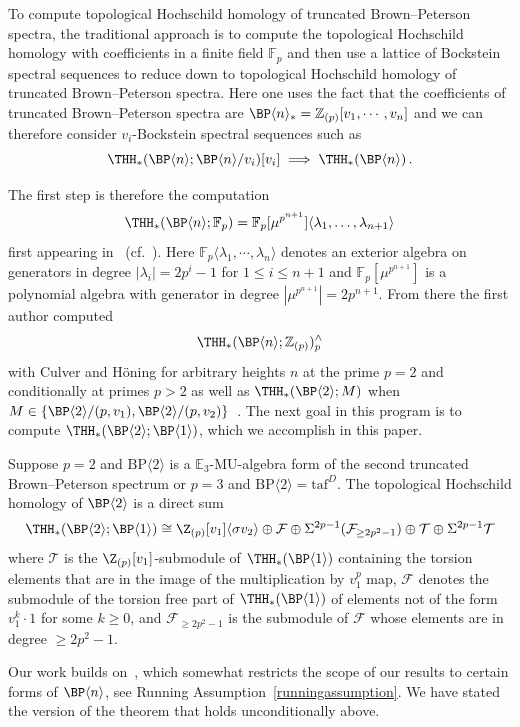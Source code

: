 To compute topological Hochschild homology of truncated Brown--Peterson spectra, the traditional approach is to compute the topological Hochschild homology with coefficients in a finite field $\mathbb{F}_p$ and then use a lattice of Bockstein spectral sequences to reduce down to topological Hochschild homology of truncated Brown--Peterson spectra. Here one uses the fact that the coefficients of truncated Brown--Peterson spectra are $\BP\langle n\rangle_*=\mathbb{Z}_{(p)}[v_1,\cdots ,v_n]$ and we can therefore consider $v_i$-Bockstein spectral sequences such as 
\[ 
\THH_*(\BP\langle n\rangle;\BP\langle n\rangle/v_i)[v_i]\implies \THH_*(\BP\langle n\rangle)\,.
\]

The first step is therefore the computation 
\[ \THH_*(\BP\langle n\rangle;\mathbb{F}_p)=\mathbb{F}_p[\mu^{p^{n+1}}]\langle \lambda_1,\dots ,\lambda_{n+1} \rangle
\]
first appearing in~\cite{ACH24} (cf.~\cite{Ang26}). Here  $\mathbb{F}_p\langle \lambda_1,\cdots ,\lambda_n\rangle$ denotes an exterior algebra on generators in degree $|\lambda_{i}|=2p^i-1$ for $1\le i\le n+1$ and $\mathbb{F}_p[\mu^{p^{n+1}}]$ is a polynomial algebra with generator in degree $|\mu^{p^{n+1}}|=2p^{n+1}$. From there the first author computed 
\[ \THH_*(\BP\langle n\rangle ; \mathbb{Z}_{(p)})_p^{\wedge}\]
with Culver and H\"oning for arbitrary heights $n$ at the prime $p=2$ and conditionally at primes $p>2$ as well as 
$\THH_*(\BP\langle 2\rangle ; M)$
when $M\in \{\BP\langle 2\rangle/(p,v_1),\BP\langle 2\rangle /(p,v_2)\}$~\cite{ACH24}. The next goal in this program is to compute $\THH_*(\BP\langle 2\rangle;\BP\langle 1\rangle)$,
which we accomplish in this paper. 

\begin{thmx}\label{thm:main}
  Suppose $p=2$ and $\mathrm{BP}\langle 2\rangle$ is a $\mathbb{E}_3$-$\mathrm{MU}$-algebra form of the second truncated Brown--Peterson spectrum or $p=3$ and $\mathrm{BP}\langle 2\rangle=\mathrm{taf}^{D}$. 
  The topological Hochschild homology of $\BP\langle 2\rangle$ is a direct sum
  \[
    \THH_*(\BP \langle 2 \rangle ; \BP \langle 1 \rangle) \cong \Z_{(p)}[v_1] \langle \sigma v_2 \rangle \oplus \mathcal{F} \oplus \Sigma^{2p - 1} (\mathcal{F}_{\geq 2p^2 - 1}) \oplus \mathcal{T} \oplus \Sigma^{2p - 1} \mathcal{T}
  \]
  where $\mathcal{T}$ is the $\Z_{(p)}[v_1]$-submodule of $\THH_*(\BP \langle 1 \rangle)$ containing the torsion elements that are in the image of the multiplication by $v_1^p$ map,  $\mathcal{F}$ denotes the submodule of the torsion free part of $\THH_*(\BP \langle 1 \rangle)$ of elements not of the form $v_1^k \cdot 1$ for some $k \geq 0$, and $\mathcal{F}_{\geq 2p^2 -1}$ is the submodule of $\mathcal{F}$ whose elements are in degree $\geq 2p^2 -1$.
\end{thmx}
Our work builds on~\cite[Theorem~3.8]{ACH24}, which somewhat restricts the scope of our results to certain forms of $\BP\langle n\rangle$, see Running Assumption~\ref{runningassumption}. We have stated the version of the theorem that holds unconditionally above. 

